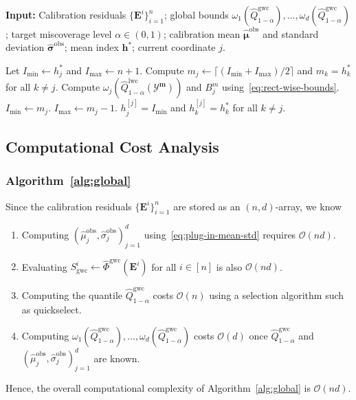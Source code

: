 \begin{algorithm}[!htb]
\caption{Binary Search in Algorithm~\ref{alg:shortcut}}
\label{alg:binary}
\textbf{Input:} Calibration residuals $\{\mathbf{E}^i\}_{i=1}^{n}$; global bounds $\omega_1(\hat{Q}^{\mathrm{gwc}}_{1-\alpha}),\ldots,\omega_d(\hat{Q}^{\mathrm{gwc}}_{1-\alpha})$; target miscoverage level $\alpha\in(0,1)$; calibration mean $\hat{\boldsymbol\mu}^{\mathrm{obs}}$ and standard deviation $\hat{\boldsymbol\sigma}^{\mathrm{obs}}$; mean index $\mathbf{h}^*$; current coordinate $j$.
\begin{algorithmic}[1]
    \State Let $I_{\min} \gets h^*_j$ and $I_{\max} \gets n+1$.
        \State Compute $m_j\gets \lceil (I_{\mathrm{min}}+I_\mathrm{max})/2\rceil$ and $m_k = h^*_k$ for all $k\neq j$.
        \State Compute $\omega_j(\hat{Q}^{\mathrm{lwc}}_{1-\alpha}(\mathcal{Y}^{\mathbf{m}}))$ and $B^{m}_j$ using~\eqref{eq:rect-wise-bounds}.\hfill
            \State $I_{\mathrm{min}} \gets m_j$.
        \Else 
            \State $I_{\mathrm{max}} \gets m_j-1$.
        \EndIf
            \State \Return $h^{[j]}_j = I_{\min}$ and $h^{[j]}_k = h^*_k$ for all $k\neq j$.
        \EndIf
    \EndWhile
\end{algorithmic}
\end{algorithm}


\FloatBarrier

\subsection{Computational Cost Analysis}\label{app:alg-and-cost}

\subsubsection{Algorithm~\ref{alg:global}}
\label{app:gwc-cost}
Since the calibration residuals $\{\mathbf{E}^i\}_{i=1}^{n}$ are stored as an $(n,d)$-array, we know
\begin{enumerate}
    \item Computing $(\hat\mu^{\mathrm{obs}}_j,\hat\sigma^{\mathrm{obs}}_j)_{j=1}^d$ using~\eqref{eq:plug-in-mean-std} requires $\mathcal O(nd)$.
    \item Evaluating $S^i_{\mathrm{gwc}}\gets \hat{\Phi}^{\mathrm{gwc}}(\mathbf{E}^i)$ for all $i\in[n]$ is also $\mathcal O(nd)$.
    \item Computing the quantile $\hat{Q}^{\mathrm{gwc}}_{1-\alpha}$ costs $\mathcal O(n)$ using a selection algorithm such as quickselect. 
    \item Computing $\omega_1(\hat{Q}^{\mathrm{gwc}}_{1-\alpha}),\ldots,\omega_d(\hat{Q}^{\mathrm{gwc}}_{1-\alpha})$ costs $\mathcal{O}(d)$ once $\hat{Q}^{\mathrm{gwc}}_{1-\alpha}$ and $(\hat\mu^{\mathrm{obs}}_j,\hat\sigma^{\mathrm{obs}}_j)_{j=1}^d$ are known.
\end{enumerate}
Hence, the overall computational complexity of Algorithm~\ref{alg:global} is $\mathcal O(nd)$.

